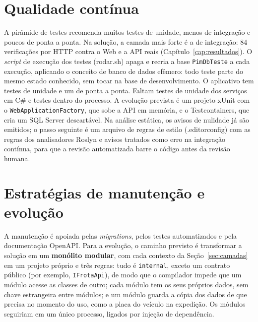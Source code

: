 \section{Qualidade contínua}

A pirâmide de testes recomenda muitos testes de unidade, menos de integração e poucos de ponta a ponta. Na solução, a camada mais forte é a de integração: 84 verificações por HTTP contra o Web e a API reais (Capítulo~\ref{cap:resultados}). O \textit{script} de execução dos testes (rodar.sh) apaga e recria a base \texttt{PimDbTeste} a cada execução, aplicando o conceito de banco de dados efêmero: todo teste parte do mesmo estado conhecido, sem tocar na base de desenvolvimento. O aplicativo tem testes de unidade e um de ponta a ponta. Faltam testes de unidade dos serviços em C\# e testes dentro do processo. A evolução prevista é um projeto xUnit com o \texttt{WebApplicationFactory}, que sobe a API em memória, e o Testcontainers, que cria um SQL Server descartável. Na análise estática, os avisos de nulidade já são emitidos; o passo seguinte é um arquivo de regras de estilo (.editorconfig) com as regras dos analisadores Roslyn e avisos tratados como erro na integração contínua, para que a revisão automatizada barre o código antes da revisão humana.

\section{Estratégias de manutenção e evolução}
\label{sec:evolucao}

A manutenção é apoiada pelas \textit{migrations}, pelos testes automatizados e pela documentação OpenAPI. Para a evolução, o caminho previsto é transformar a solução em um \textbf{monólito modular}, com cada contexto da Seção~\ref{sec:camadas} em um projeto próprio e três regras: tudo é \texttt{internal}, exceto um contrato público (por exemplo, \texttt{IFrotaApi}), de modo que o compilador impede que um módulo acesse as classes de outro; cada módulo tem os seus próprios dados, sem chave estrangeira entre módulos; e um módulo guarda a cópia dos dados de que precisa no momento do uso, como a placa do veículo na expedição. Os módulos seguiriam em um único processo, ligados por injeção de dependência.
